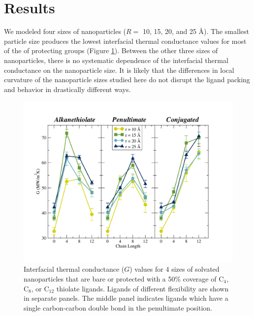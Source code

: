 \section{Results}

We modeled four sizes of nanoparticles ($R =$ 10, 15, 20, and 25
\AA). The smallest particle size produces the lowest interfacial
thermal conductance values for most of the of protecting groups
(Figure \ref{fig:NPthiols_G}).  Between the other three sizes of
nanoparticles, there is no systematic dependence of the interfacial
thermal conductance on the nanoparticle size. It is likely that the
differences in local curvature of the nanoparticle sizes studied here
do not disrupt the ligand packing and behavior in drastically
different ways.

\begin{figure}
  \includegraphics[width=\linewidth]{figures/G3}
  \caption{Interfacial thermal conductance ($G$) values for 4
      sizes of solvated nanoparticles that are bare or protected with
      a 50\% coverage of C$_{4}$, C$_{8}$, or C$_{12}$ thiolate
      ligands. Ligands of different flexibility are shown in separate
      panels.  The middle panel indicates ligands which have a single
      carbon-carbon double bond in the penultimate position.}
  \label{fig:NPthiols_G}
\end{figure}


